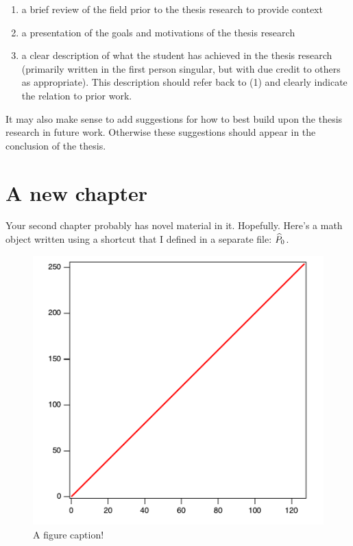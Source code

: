 \documentclass[letterpaper,12pt]{yalephd}
\begin{document}
\begin{enumerate}
  \item a brief review of the field prior to the thesis research to provide context
  \item a presentation of the goals and motivations of the thesis research 
  \item a clear description of what the student has achieved in the thesis research
 (primarily written in the first person singular, but with due credit to
 others as appropriate). This description should refer back to (1) and clearly indicate the relation
 to prior work.
\end{enumerate}
It may also make sense to add suggestions for how to best build upon the thesis research in future work. Otherwise these suggestions should appear in the conclusion of the thesis.


\chapter{A new chapter} \label{chapter2}
Your second chapter probably has novel material in it. Hopefully. Here's a math object written using a shortcut that I defined in a separate file: $\widehat{P}_0$.





\begin{figure}[ht]
\centering
\includegraphics[width=.45\textwidth]{name_of_figure.pdf}
\caption[Short caption for the list of figures]{A figure caption!}
\label{a_figure}
\end{figure}
\end{document}
